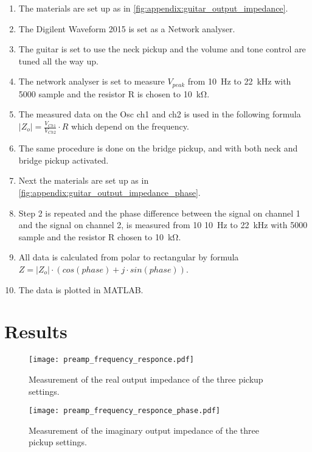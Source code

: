 \begin{enumerate}
\item The materials are set up as in \autoref{fig:appendix:guitar_output_impedance}.
\item The Digilent Waveform 2015 is set as a Network analyser.
\item  The guitar is set to use the neck pickup and the volume and tone control are tuned all the way up.
\item  The network analyser is set to measure $V_{peak}$ from \SI{10}{\hertz} to \SI{22}{\kilo\hertz} with 5000 sample and the resistor R is chosen to \SI{10}{\kilo\ohm}.
\item The measured data on the Osc ch1 and ch2 is used in the following formula $\left | Z_o \right | = \frac{V_{Ch1}}{V_{Ch2}}\cdot R$ which depend on the frequency. 
\item The same procedure is done on the bridge pickup, and with both neck and bridge pickup activated.
\item Next the materials are set up as in \autoref{fig:appendix:guitar_output_impedance_phase}.
\item Step 2 is repeated and the  phase difference between the signal on channel 1 and the signal on channel 2, is measured from 10 \SI{10}{\hertz} to \SI{22}{\kilo\hertz} with 5000 sample and the resistor R chosen to \SI{10}{\kilo\ohm}.
\item All data is calculated from polar to rectangular by formula $Z=\left | Z_o \right | \cdot (cos(phase) + j \cdot sin(phase))$.
\item The data is plotted in MATLAB.
\end{enumerate}

\newpage
\section*{Results}

\begin{figure}[htbp!]
	\centering
		\texttt{[image: preamp\_frequency\_responce.pdf]}
		\caption{Measurement of the real output impedance of the three pickup settings.}
		\label{fig:appendix:real_impedance}
		\texttt{[image: preamp\_frequency\_responce\_phase.pdf]}
		\caption{Measurement of the imaginary output impedance of the three pickup settings.}
		\label{fig:appendix:imaginary_impedance}
\end{figure}

